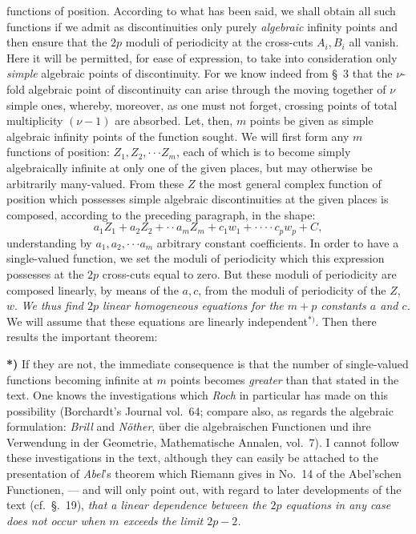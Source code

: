 \documentclass{article}
\begin{document}
functions of position. According to what has been said, we shall obtain all such functions if we admit as discontinuities only purely \emph{algebraic} infinity points and then ensure that the $2p$ moduli of periodicity at the cross-cuts $A_{i}, B_{i}$ all vanish. Here it will be permitted, for ease of expression, to take into consideration only \emph{simple} algebraic points of discontinuity. For we know indeed from §~3 that the $\nu$-fold algebraic point of discontinuity can arise through the moving together of $\nu$ simple ones, whereby, moreover, as one must not forget, crossing points of total multiplicity $(\nu - 1)$ are absorbed. Let, then, $m$ points be given as simple algebraic infinity points of the function sought. We will first form any $m$ functions of position: $Z_{1}, Z_{2}, \cdot\cdot\cdot Z_{m}$, each of which is to become simply algebraically infinite at only one of the given places, but may otherwise be arbitrarily many-valued. From these $Z$ the most general complex function of position which possesses simple algebraic discontinuities at the given places is composed, according to the preceding paragraph, in the shape:
\[ a_{1}Z_{1} + a_{2}Z_{2} + \cdot\cdot a_{m}Z_{m} + c_{1}w_{1} + \cdot\cdot\cdot\cdot c_{p}w_{p} + C, \]
understanding by $a_{1}, a_{2}, \cdot\cdot\cdot a_{m}$ arbitrary constant coefficients. In order to have a single-valued function, we set the moduli of periodicity which this expression possesses at the $2p$ cross-cuts equal to zero. But these moduli of periodicity are composed linearly, by means of the $a, c$, from the moduli of periodicity of the $Z$, $w$. \emph{We thus find $2p$ linear homogeneous equations for the $m + p$ constants $a$ and $c$.} We will assume that these equations are linearly independent${}^{*)}$. Then there results the important theorem:

\textbf{*)} If they are not, the immediate consequence is that the number of single-valued functions becoming infinite at $m$ points becomes \emph{greater} than that stated in the text. One knows the investigations which \emph{Roch} in particular has made on this possibility (Borchardt's Journal vol.~64; compare also, as regards the algebraic formulation: \emph{Brill} and \emph{Nöther}, über die algebraischen Functionen und ihre Verwendung in der Geometrie, Mathematische Annalen, vol.~7). I cannot follow these investigations in the text, although they can easily be attached to the presentation of \emph{Abel}'s theorem which Riemann gives in No.~14 of the Abel'schen Functionen, --- and will only point out, with regard to later developments of the text (cf.\ §.~19), \emph{that a linear dependence between the $2p$ equations in any case does not occur when $m$ exceeds the limit $2p - 2$.}
\end{document}
